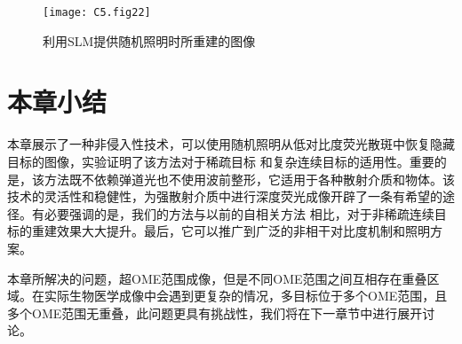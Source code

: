 \begin{figure}[htp]
	\centering
	\texttt{[image: C5.fig22]}
	\caption{利用SLM提供随机照明时所重建的图像}
	\label{fig:5.22}
\end{figure}

\section{本章小结}

本章展示了一种非侵入性技术，可以使用随机照明从低对比度荧光散斑中恢复隐藏目标的图像，实验证明了该方法对于稀疏目标 和复杂连续目标的适用性。重要的是，该方法既不依赖弹道光也不使用波前整形，它适用于各种散射介质和物体。该技术的灵活性和稳健性，为强散射介质中进行深度荧光成像开辟了一条有希望的途径。有必要强调的是，我们的方法与以前的自相关方法 \cite{bertolotti_non-invasive_2012,katz_non-invasive_2014} 相比，对于非稀疏连续目标的重建效果大大提升。最后，它可以推广到广泛的非相干对比度机制和照明方案。

本章所解决的问题，超OME范围成像，但是不同OME范围之间互相存在重叠区域。在实际生物医学成像中会遇到更复杂的情况，多目标位于多个OME范围，且多个OME范围无重叠，此问题更具有挑战性，我们将在下一章节中进行展开讨论。
